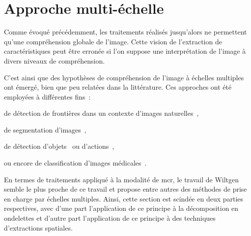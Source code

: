 \section{Approche multi-échelle}
Comme évoqué précédemment, les traitements réalisés jusqu'alors ne permettent qu'une compréhension globale de l'image. Cette vision de l'extraction de caractéristiques peut être erronée si l'on suppose une interprétation de l'image à divers niveaux de compréhension.\par

C'est ainsi que des hypothèses de compréhension de l'image à échelles multiples ont émergé, bien que peu relatées dans la littérature. Ces approches ont été employées à différentes fins~:
\begin{inlinerate}
    \item de détection de frontières dans un contexte d'images naturelles~\cite{Ren2008},
    \item de segmentation d'images~\cite{DosSantos2012,Arbelaez2014},
    \item de détection d'objets~\cite{Felzenszwalb2008} ou d'actions~\cite{Pedersoli2011},
    \item ou encore de classification d'images médicales~\cite{Alsaih2016,Tang2017}.
\end{inlinerate} En termes de traitements appliqué à la modalité de \gls{mcr}, le travail de Wiltgen~ semble le plus proche de ce travail et propose entre autres des méthodes de prise en charge par échelles multiples. Ainsi, cette section est scindée en deux parties respectives, avec d'une part l'application de ce principe à la décomposition en ondelettes et d'autre part l'application de ce principe à des techniques d'extractions spatiales.\par 


